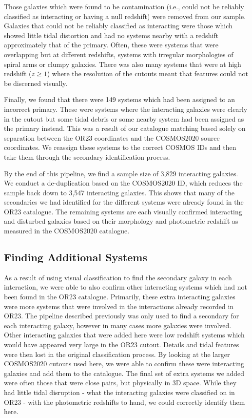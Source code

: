 \documentclass[fleqn,usenatbib]{mnras}
\begin{document}
Those galaxies which were found to be contamination (i.e., could not be reliably classified as interacting or having a null redshift) were removed from our sample. Galaxies that could not be reliably classified as interacting were those which showed little tidal distortion and had no systems nearby with a redshift approximately that of the primary. Often, these were systems that were overlapping but at different redshifts, systems with irregular morphologies of spiral arms or clumpy galaxies. There was also many systems that were at high redshift ($z \geq 1$) where the resolution of the cutouts meant that features could not be discerned visually.

Finally, we found that there were 149 systems which had been assigned to an incorrect primary. These were systems where the interacting galaxies were clearly in the cutout but some tidal debris or some nearby system had been assigned as the primary instead. This was a result of our catalogue matching based solely on separation between the OR23 coordinates and the COSMOS2020 source coordinates. We reassign these systems to the correct COSMOS IDs and then take them through the secondary identification process.

By the end of this pipeline, we find a sample size of 3,829 interacting galaxies. We conduct a de-duplication based on the COSMOS2020 ID, which reduces the sample back down to 3,547 interacting galaxies. This shows that many of the secondaries we had identified for the different systems were already found in the OR23 catalogue. The remaining systems are each visually confirmed interacting and disturbed galaxies based on their morphology and photometric redshift as measured in the COSMOS2020 catalogue.

\subsection{Finding Additional Systems}
\noindent As a result of using visual classification to find the secondary galaxy in each interaction, we were able to also confirm other interacting systems which had not been found in the OR23 catalogue. Primarily, these extra interacting galaxies were more systems that were involved in the interactions already recorded in OR23. The pipeline described previously was only used to find a secondary for each interacting galaxy, however in many cases more galaxies were involved. Other interacting galaxies that were added here were low redshift systems which would have appeared very large in the OR23 cutout. Details and tidal features were then lost in the original classification process. By looking at the larger COSMOS2020 cutouts used here, we were able to confirm these were interacting galaxies and add them to the catalogue. The final set of extra systems we added were often those that were close pairs, but physically in 3D space. While they had little tidal disruption - what the interacting galaxies were classified on in OR23 - with the photometric redshifts to hand, we could correctly identify them here.
\end{document}
